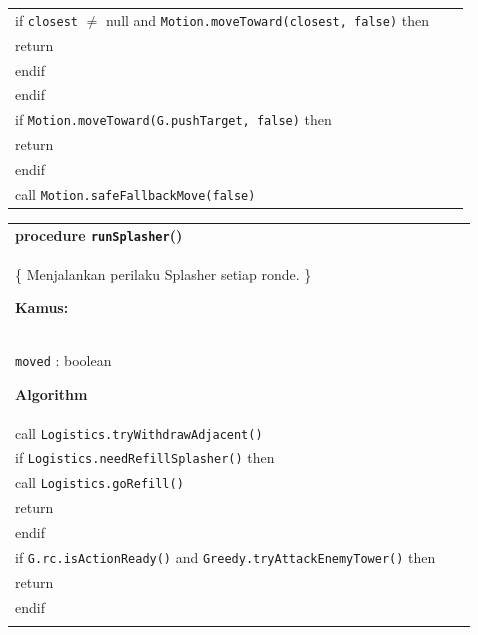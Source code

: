 \documentclass{article}
\newenvironment{pseudobox}
{
\centering
\begin{longtable}{|p{0.94\linewidth}|}
\hline
}
{
\\ \hline
\end{longtable}
\vspace{0.05cm}
}
\begin{document}
\begin{enumerate}[label=\alph*.]
\begin{enumerate}[label=\alph*.]
\begin{pseudobox}
\hspace*{3em}if \texttt{closest} $\neq$ null and \texttt{Motion.moveToward(closest, false)} then \\
\hspace*{4.5em}return \\
\hspace*{3em}endif \\
\hspace*{1.5em}endif \\

\hspace*{1.5em}if \texttt{Motion.moveToward(G.pushTarget, false)} then \\
\hspace*{3em}return \\
\hspace*{1.5em}endif \\

\hspace*{1.5em}call \texttt{Motion.safeFallbackMove(false)}
\end{pseudobox}

\begin{pseudobox}
\textbf{procedure \texttt{runSplasher}()} \\
\{ Menjalankan perilaku Splasher setiap ronde. \}

\textbf{Kamus:} \\
\hspace*{1.5em}\texttt{moved} : boolean

\textbf{Algorithm} \\
\hspace*{1.5em}call \texttt{Logistics.tryWithdrawAdjacent()} \\

\hspace*{1.5em}if \texttt{Logistics.needRefillSplasher()} then \\
\hspace*{3em}call \texttt{Logistics.goRefill()} \\
\hspace*{3em}return \\
\hspace*{1.5em}endif \\

\hspace*{1.5em}if \texttt{G.rc.isActionReady()} and \texttt{Greedy.tryAttackEnemyTower()} then \\
\hspace*{3em}return \\
\hspace*{1.5em}endif \\


\end{pseudobox}
\end{enumerate}
\end{enumerate}
\end{document}
